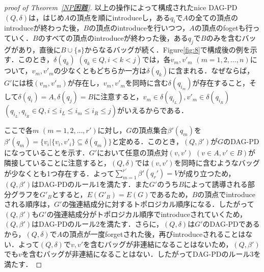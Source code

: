 \documentclass[master]{kuisthesis}		%
\theoremstyle{plain}
\theoremstyle{definition}
\begin{document}
\begin{proof}[proof of Theorem~\ref{NP困難}]
    
    以上の操作によって構成されたnice DAG-PD $(Q, \delta)$は，はじめ$A$の頂点を順にintroduceし，ある$q_i$で$A$の全ての頂点のintroduceが終わった後，$B$の頂点のintroduceを行いつつ，$A$の頂点のfogetも行っていく．$B$のすべての頂点のintroduceが終わった後，ある$q_j$で$B$のみを含むバッグがあり，直後に$B \cup \{s\}$からなるバッグが続く．Figure\ref{fig:8}で構成後の例を示す．このとき，$\delta(q_k)$ $(q_k \in Q, i < k < j)$では，各$v_m, v'_m$ $(m = 1, 2, \dots, n)$について，$v_m, v'_m$の少なくともどちらか一方は$\delta(q_k)$に含まれる．なぜならば，$G'$には枝$(v_m, v'_m)$が存在し，$v_m, v'_m$を同時に含む$\delta(q_{i_m})$が存在すること，そして$\delta(q_i) = A, \delta(q_j) = B$に注意すると，$v_m \in \delta(q_{i_L}), v'_m \in \delta(q_{i_R})$ $(q_{i_L}, q_{i_R} \in Q, i \leq i_L \leq i_m \leq i_R \leq j)$がいえるからである．
    
    ここで各$m$ $(m = 1, 2, \dots, r')$に対し，$G$の頂点集合$\beta'(q_m)$を$\beta'(q_m) = \{v_i | \{v_i, v'_i\} \subseteq \delta(q_m) \}$と定める．このとき，$(Q, \beta')$が$G$のDAG-PDになっていることを示す．$G'$において任意の頂点対$(v, v')$ $(v \in A, v' \in B)$が隣接していることに注意すると，$(Q, \delta)$では$(v, v')$を同時に含むようなバッグが少なくとも1つ存在する．よって$\sum_{m=1}^{r'}\beta'(q_r') = V$が成り立つため，$(Q, \beta')$はDAG-PDのルール1を満たす．また$G'$のうち$B$によって誘導される部分グラフを$G'_B$とすると，$E(G'_B) = E(G)$であるため，$B$の頂点でintroduceされる順序は，$G'$の強連結成分に対するトポロジカル順序になる．したがって$(Q, \beta')$も$G'$の強連結成分がトポロジカル順序でintroduceされていくため，$(Q, \beta')$はDAG-PDのルール2を満たす．さらに，$(Q, \delta)$は$G'$のDAG-PDであるから，$(Q, \delta)$で$A$の頂点が一度forgetされた後，再びintroduceされることはない．よって$(Q, \delta)$で${v, v'}$を含むバッグが非連結になることはないため，$(Q, \beta')$でも$v$を含むバッグが非連結になることはない．したがってDAG-PDのルール3を満たす．


\end{proof}
\end{document}
